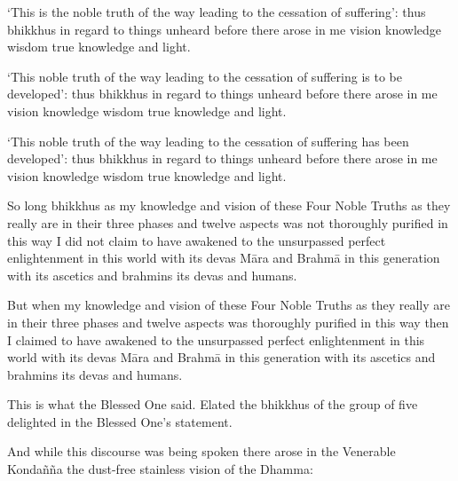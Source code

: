 \begin{english-only-hang}
  `This is the noble truth of the way leading to the cessation of suffering': thus bhikkhus in regard to things unheard before there arose in me vision knowledge wisdom true knowledge and light.
\end{english-only-hang}

\begin{english-only-hang}
  `This noble truth of the way leading to the cessation of suffering is to be developed': thus bhikkhus in regard to things unheard before there arose in me vision knowledge wisdom true knowledge and light.
\end{english-only-hang}

\begin{english-only-hang}
  `This noble truth of the way leading to the cessation of suffering has been developed': thus bhikkhus in regard to things unheard before there arose in me vision knowledge wisdom true knowledge and light.
\end{english-only-hang}

\begin{english-only-hang}
  So long bhikkhus as my knowledge and vision of these Four Noble Truths as they really are in their three phases and twelve aspects was not thoroughly purified in this way I did not claim to have awakened to the unsurpassed perfect enlightenment in this world with its devas Māra and Brahmā in this generation with its ascetics and brahmins its devas and humans.
\end{english-only-hang}

\begin{english-only-hang}
  But when my knowledge and vision of these Four Noble Truths as they really are in their three phases and twelve aspects was thoroughly purified in this way then I claimed to have awakened to the unsurpassed perfect enlightenment in this world with its devas Māra and Brahmā in this generation with its ascetics and brahmins its devas and humans.
\end{english-only-hang}

\begin{english-only-hang}
  This is what the Blessed One said. Elated the bhikkhus of the group of five delighted in the Blessed One's statement.
\end{english-only-hang}

\begin{english-only-hang}
  And while this discourse was being spoken there arose in the Venerable Kondañña the dust-free stainless vision of the Dhamma:
\end{english-only-hang}

